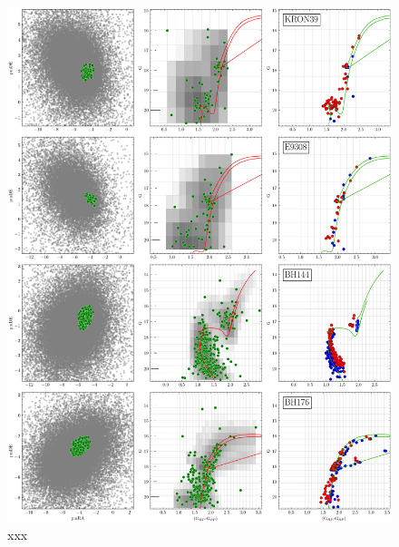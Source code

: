 \documentclass{aa}
\begin{document}
\begin{appendix}
 \begin{figure}
  \centering
  \includegraphics[height=.95\textheight]{figs/16_fpars.png}
  \caption{xxx}
  \label{fig:16fpars}
 \end{figure}


\end{appendix}
\end{document}
